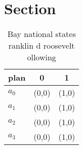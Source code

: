 \documentclass[a4paper]{article}
\begin{document}
\section{Section}

\begin{table}
\begin{adjustbox}{width=1\columnwidth}
\begin{tabular}{|l|l|l|}
\hline
\textbf{plan} & \multicolumn{1}{c|}{\textbf{0}} & \multicolumn{1}{c|}{\textbf{1}} \\ \hline
\textbf{$a_0$}  & (0,0) & (1,0) \\ \hline
\textbf{$a_1$}  & (0,0) & (1,0) \\ \hline
\textbf{$a_2$}  & (0,0) & (1,0) \\ \hline
\textbf{$a_3$}  & (0,0) & (1,0) \\ \hline
\end{tabular}
\end{adjustbox}
\caption{Bay national states ranklin d roosevelt ollowing 
}
\end{table}
\end{document}
